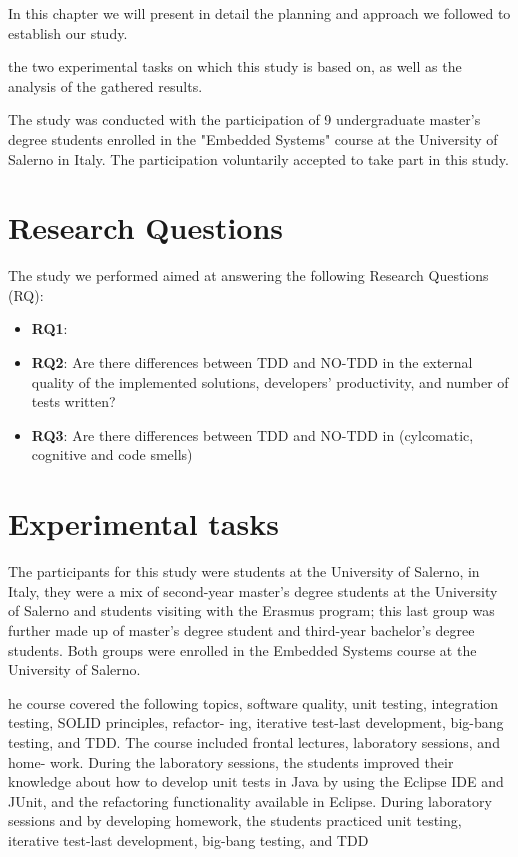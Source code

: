 In this chapter we will present in detail the planning and approach we followed to establish our study.

the two experimental tasks on which this study is based on, as well as the analysis of the gathered results.

The study was conducted with the participation of 9 undergraduate master's degree students enrolled in the "Embedded Systems" course at the University of Salerno in Italy. The participation voluntarily accepted to take part in this study.


\section{Research Questions}
The study we performed aimed at answering the following Research Questions (RQ):
\begin{itemize}
    \item \textbf{RQ1}:
    \item \textbf{RQ2}: Are there differences between TDD and NO-TDD in the external quality of the implemented solutions, developers’ productivity, and number of tests written?
    \item \textbf{RQ3}: Are there differences between TDD and NO-TDD in (cylcomatic, cognitive and code smells)
\end{itemize}




\section{Experimental tasks}
The participants for this study were students at the University of Salerno, in Italy, they were a mix of second-year master's degree students at the University of Salerno and students visiting with the Erasmus program; this last group was further made up of master's degree student and third-year bachelor's degree students. Both groups were enrolled in the Embedded Systems course at the University of Salerno.

he course covered the following topics, software
quality, unit testing, integration testing, SOLID principles, refactor-
ing, iterative test-last development, big-bang testing, and TDD. The
course included frontal lectures, laboratory sessions, and home-
work. During the laboratory sessions, the students improved their
knowledge about how to develop unit tests in Java by using the
Eclipse IDE and JUnit, and the refactoring functionality available in
Eclipse. During laboratory sessions and by developing homework,
the students practiced unit testing, iterative test-last development,
big-bang testing, and TDD

